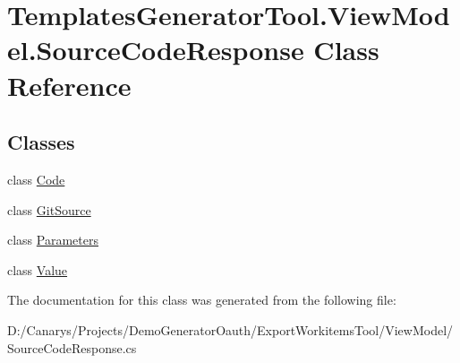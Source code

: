 \hypertarget{class_templates_generator_tool_1_1_view_model_1_1_source_code_response}{}\section{Templates\+Generator\+Tool.\+View\+Model.\+Source\+Code\+Response Class Reference}
\label{class_templates_generator_tool_1_1_view_model_1_1_source_code_response}
\subsection*{Classes}
\begin{DoxyCompactItemize}
\item 
class \mbox{\hyperlink{class_templates_generator_tool_1_1_view_model_1_1_source_code_response_1_1_code}{Code}}
\item 
class \mbox{\hyperlink{class_templates_generator_tool_1_1_view_model_1_1_source_code_response_1_1_git_source}{Git\+Source}}
\item 
class \mbox{\hyperlink{class_templates_generator_tool_1_1_view_model_1_1_source_code_response_1_1_parameters}{Parameters}}
\item 
class \mbox{\hyperlink{class_templates_generator_tool_1_1_view_model_1_1_source_code_response_1_1_value}{Value}}
\end{DoxyCompactItemize}


The documentation for this class was generated from the following file\+:\begin{DoxyCompactItemize}
\item 
D\+:/\+Canarys/\+Projects/\+Demo\+Generator\+Oauth/\+Export\+Workitems\+Tool/\+View\+Model/Source\+Code\+Response.\+cs\end{DoxyCompactItemize}
